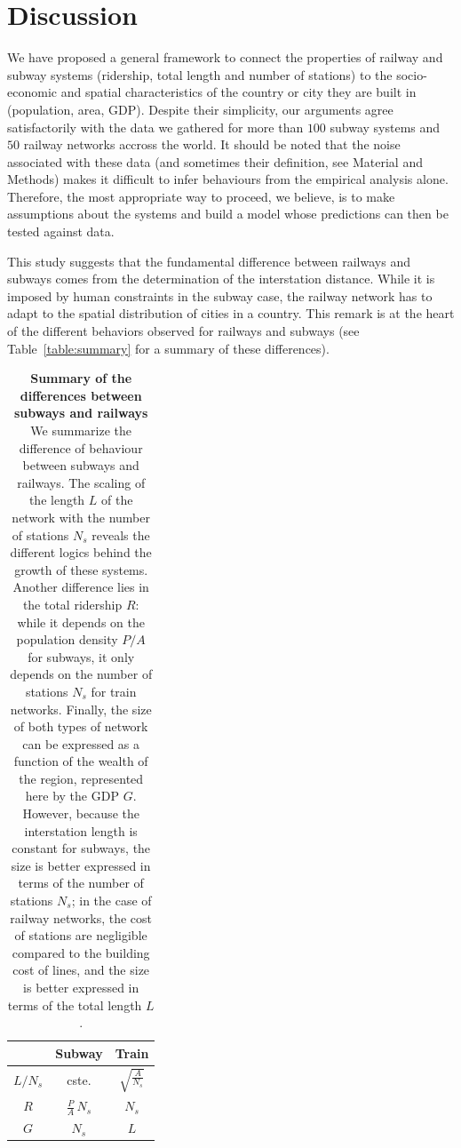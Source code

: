 \section*{Discussion}

We have proposed a general framework to connect the properties of railway and
subway systems (ridership, total length and number of stations) to the
socio-economic and spatial characteristics of the country or city they are built
in (population, area, GDP). Despite their simplicity, our arguments agree
satisfactorily with the data we gathered for more than $100$ subway systems and
$50$ railway networks accross the world. It should be noted that the noise
associated with these data (and sometimes their definition, see Material and
Methods) makes it difficult to infer behaviours from the empirical analysis
alone. Therefore, the most appropriate way to proceed, we believe, is to make
assumptions about the systems and build a model whose predictions can then be
tested against data.

This study suggests that the fundamental difference between railways and subways
comes from the determination of the interstation distance. While it is imposed
by human constraints in the subway case, the railway network has to adapt to the
spatial distribution of cities in a country. This remark is at the heart of the
different behaviors observed for railways and subways (see
Table~\ref{table:summary} for a summary of these differences). 

\begin{table}[!ht]
\centering
\begin{tabular}{|c|c|c|}
\hline
 & {\bf Subway} & {\bf Train} \\
 \hline
$L / N_s$ & cste. & $\sqrt{\frac{A}{N_s}}$\\
$R$ & $\frac{P}{A}\,N_s$ & $N_s$ \\
$G$ & $N_s$ & $L$ \\
\hline
\end{tabular}
\caption{{\bf Summary of the differences between subways and railways}
We summarize the difference of behaviour between subways and railways. The
scaling of the length $L$ of the network with the number of stations $N_s$
reveals the different logics behind the growth of these systems. Another
difference lies in the total ridership $R$: while it depends on the population
density $P/A$ for subways, it only depends on the number of stations $N_s$ for
train networks. Finally, the size of both types of network can be expressed as a
function of the wealth of the region, represented here by the GDP $G$. However,
because the interstation length is constant for subways, the size is better
expressed in terms of the number of stations $N_s$; in the case of railway
networks, the cost of stations are negligible compared to the building cost of
lines, and the size is better expressed in terms of the total length $L$.
\label{table:summary}} 
\label{tab:label} 
\end{table}

